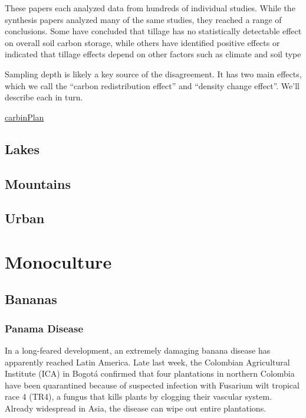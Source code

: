 \documentclass[
]{book}
\begin{document}
These papers each analyzed data from hundreds of individual studies. While the synthesis papers analyzed many of the same studies, they reached a range of conclusions. Some have concluded that tillage has no statistically detectable effect on overall soil carbon storage, while others have identified positive effects or indicated that tillage effects depend on other factors such as climate and soil type

Sampling depth is likely a key source of the disagreement. It has two main effects, which we call the ``carbon redistribution effect'' and ``density change effect''. We'll describe each in turn.

\href{https://carbonplan.org/research/soil-depth-sampling}{carbinPlan}

\hypertarget{lakes}{%
\section{Lakes}\label{lakes}}

\hypertarget{mountains}{%
\section{Mountains}\label{mountains}}

\hypertarget{urban}{%
\section{Urban}\label{urban}}

\hypertarget{monoculture}{%
\chapter{Monoculture}\label{monoculture}}

\hypertarget{bananas}{%
\section{Bananas}\label{bananas}}

\hypertarget{panama-disease}{%
\subsection{Panama Disease}\label{panama-disease}}

In a long-feared development, an extremely damaging banana disease has apparently reached Latin America. Late last week, the Colombian Agricultural Institute (ICA) in Bogotá confirmed that four plantations in northern Colombia have been quarantined because of suspected infection with Fusarium wilt tropical race 4 (TR4), a fungus that kills plants by clogging their vascular system. Already widespread in Asia, the disease can wipe out entire plantations.
\end{document}
